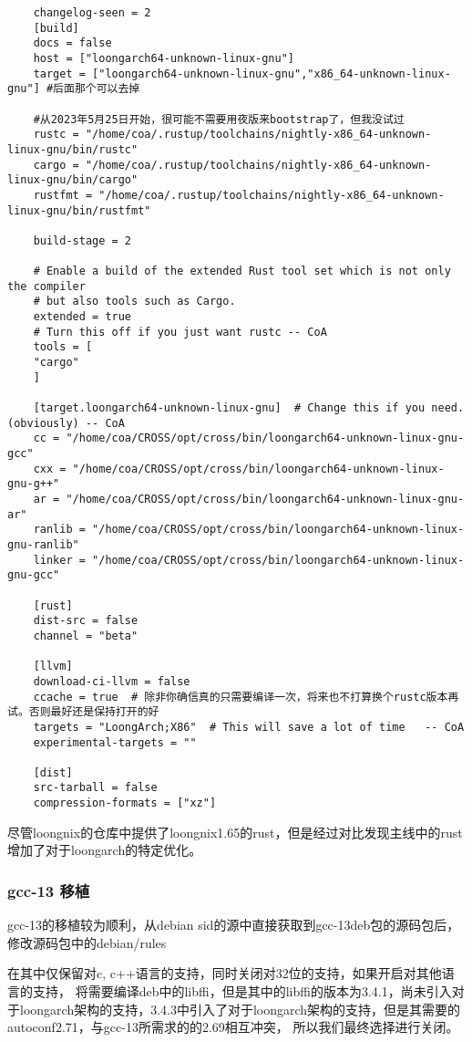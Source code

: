 \documentclass[lang=cn,a4paper,newtx]{elegantpaper}
\begin{document}
\begin{lstlisting}
    changelog-seen = 2
    [build]
    docs = false
    host = ["loongarch64-unknown-linux-gnu"]
    target = ["loongarch64-unknown-linux-gnu","x86_64-unknown-linux-gnu"] #后面那个可以去掉

    #从2023年5月25日开始，很可能不需要用夜版来bootstrap了，但我没试过
    rustc = "/home/coa/.rustup/toolchains/nightly-x86_64-unknown-linux-gnu/bin/rustc"
    cargo = "/home/coa/.rustup/toolchains/nightly-x86_64-unknown-linux-gnu/bin/cargo"
    rustfmt = "/home/coa/.rustup/toolchains/nightly-x86_64-unknown-linux-gnu/bin/rustfmt"

    build-stage = 2

    # Enable a build of the extended Rust tool set which is not only the compiler
    # but also tools such as Cargo. 
    extended = true
    # Turn this off if you just want rustc -- CoA
    tools = [    
    "cargo"
    ]

    [target.loongarch64-unknown-linux-gnu]  # Change this if you need. (obviously) -- CoA
    cc = "/home/coa/CROSS/opt/cross/bin/loongarch64-unknown-linux-gnu-gcc"
    cxx = "/home/coa/CROSS/opt/cross/bin/loongarch64-unknown-linux-gnu-g++"
    ar = "/home/coa/CROSS/opt/cross/bin/loongarch64-unknown-linux-gnu-ar"
    ranlib = "/home/coa/CROSS/opt/cross/bin/loongarch64-unknown-linux-gnu-ranlib"
    linker = "/home/coa/CROSS/opt/cross/bin/loongarch64-unknown-linux-gnu-gcc"

    [rust]
    dist-src = false
    channel = "beta"

    [llvm]
    download-ci-llvm = false
    ccache = true  # 除非你确信真的只需要编译一次，将来也不打算换个rustc版本再试。否则最好还是保持打开的好
    targets = "LoongArch;X86"  # This will save a lot of time   -- CoA
    experimental-targets = ""  

    [dist]
    src-tarball = false
    compression-formats = ["xz"]
\end{lstlisting}

尽管loongnix的仓库中提供了loongnix1.65的rust，但是经过对比发现主线中的rust增加了对于loongarch的特定优化。

\subsubsection{gcc-13 移植}

gcc-13的移植较为顺利，从debian sid的源中直接获取到gcc-13deb包的源码包后，修改源码包中的debian/rules


在其中仅保留对c, c++语言的支持，同时关闭对32位的支持，如果开启对其他语言的支持，
将需要编译deb中的libffi，但是其中的libffi的版本为3.4.1，尚未引入对于loongarch架构的支持，3.4.3中引入了对于loongarch架构的支持，但是其需要的autoconf2.71，与gcc-13所需求的的2.69相互冲突，
所以我们最终选择进行关闭。
\end{document}
